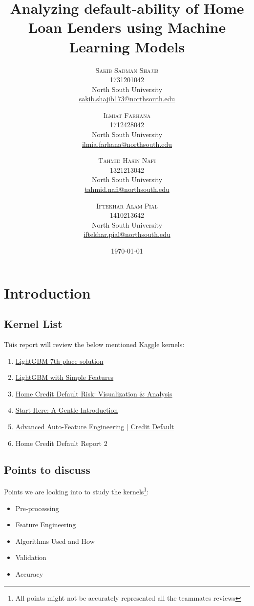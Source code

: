 \documentclass[twoside,a4paper]{article}
\title{Analyzing default-ability of Home Loan Lenders using Machine Learning Models} %
\author{%
\textsc{Sakib Sadman Shajib} \\[1ex] %
\normalsize 1731201042 \\
\normalsize North South University \\ %
\normalsize \href{mailto:sakib.shajib173@northsouth.edu}{sakib.shajib173@northsouth.edu} %
\and %
\textsc{Ilmiat Farhana} \\[1ex] %
\normalsize 1712428042 \\
\normalsize North South University \\ %
\normalsize \href{mailto:ilmia.farhana@northsouth.edu}{ilmia.farhana@northsouth.edu} %
\and %
\textsc{Tahmid Hasin Nafi} \\[1ex] %
\normalsize 1321213042 \\
\normalsize North South University \\ %
\normalsize \href{mailto:tahmid.nafi@northsouth.edu}{tahmid.nafi@northsouth.edu} %
\and %
\textsc{Iftekhar Alam Pial} \\[1ex] %
\normalsize 1410213642 \\
\normalsize North South University \\ %
\normalsize \href{mailto:iftekhar.pial@northsouth.edu}{iftekhar.pial@northsouth.edu} %
}
\date{\today} %
\begin{document}
\maketitle


\section{Introduction}

\subsection{Kernel List}

\lettrine[nindent=0em,lines=2]{T} his report will review the below mentioned Kaggle kernels:
\begin{enumerate}
    \item \href{https://www.kaggle.com/jsaguiar/lightgbm-7th-place-solution}{LightGBM 7th place solution}
    \item \href{https://www.kaggle.com/mehmettt123/lightgbm-with-simple-features}{LightGBM with Simple Features}
    \item \href{https://www.kaggle.com/charlievbc/home-credit-default-risk-visualization-analysis/notebook}{Home Credit Default Risk: Visualization \& Analysis}
    \item \href{https://www.kaggle.com/willkoehrsen/start-here-a-gentle-introduction}{Start Here: A Gentle Introduction}
    \item \href{https://www.kaggle.com/davidrivasphd/advanced-auto-feature-engineering-credit-default}{Advanced Auto-Feature Engineering | Credit Default}
    \item Home Credit Default Report 2
\end{enumerate}
    

\subsection{Points to discuss}

Points we are looking into to study the kernels\footnote{All points might not be accurately represented all the teammates reviews}:
\begin{itemize}
\item Pre-processing
\item Feature Engineering
\item Algorithms Used and How
\item Validation
\item Accuracy
\end{itemize}
\end{document}
